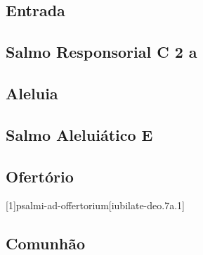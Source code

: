 
\subsection{Entrada}\label{subsection:tempus-per-annum/missa-1/introitus}

\subsection[Salmo Responsorial]{Salmo Responsorial \textmd{C 2 a}}\label{subsection:tempus-per-annum/missa-1/psalmus-responsorius}

\AllowPageFlush

\subsection{Aleluia}\label{subsection:tempus-per-annum/missa-1/alleluia}

\AllowPageFlush

\subsection[Salmo Aleluiático]{Salmo Aleluiático \textmd{E \protect\GreStar}}\label{subsection:tempus-per-annum/missa-1/psalmus-alleluiaticus}

\AllowPageFlush

\subsection{Ofertório}\label{subsection:tempus-per-annum/missa-1/offertorium}
[1]{psalmi-ad-offertorium}[iubilate-deo.7a.1]

\AllowPageFlush

\subsection{Comunhão}\label{subsection:tempus-per-annum/missa-1/communio}
